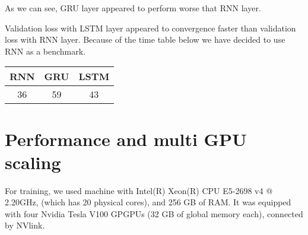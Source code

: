 \documentclass[licencjacka,en]{pracamgr}
\begin{document}
\noindent
As we can see, GRU layer appeared to perform worse that RNN layer. 
\\

\noindent%
\begin{minipage}{\linewidth}%
		\label{fig:lstm}		     
\end{minipage}

Validation loss with LSTM layer appeared to convergence faster than validation loss with RNN layer. Because of the time table below we have decided to use RNN as a benchmark.

{
\centering
\begin{tabular}{|c|c|c|}
        \hline
        RNN & GRU & LSTM \\
        \hline
        \hline
        36 & 59 & 43 \\
        \hline
    \end{tabular}
}


\section{Performance and multi GPU scaling}
For training, we used machine with Intel(R) Xeon(R) CPU E5-2698 v4 @ 2.20GHz, (which has 20 physical cores), and 256 GB of RAM. It was equipped with four Nvidia Tesla V100 GPGPUs (32 GB of global memory each), connected by NVlink.
\end{document}

